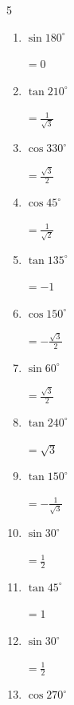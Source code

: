 \begin{multicols}{5}
\begin{enumerate}
  \item $\displaystyle \sin{180^\circ}$

        $\displaystyle =0$

  \item $\displaystyle \tan{210^\circ}$

        $\displaystyle =\frac{1}{\sqrt{3}}$

  \item $\displaystyle \cos{330^\circ}$

        $\displaystyle =\frac{\sqrt{3}}{2}$

  \item $\displaystyle \cos{45^\circ}$

        $\displaystyle =\frac{1}{\sqrt{2}}$

  \item $\displaystyle \tan{135^\circ}$

        $\displaystyle =-1$

  \item $\displaystyle \cos{150^\circ}$

        $\displaystyle =-\frac{\sqrt{3}}{2}$

  \item $\displaystyle \sin{60^\circ}$

        $\displaystyle =\frac{\sqrt{3}}{2}$

  \item $\displaystyle \tan{240^\circ}$

        $\displaystyle =\sqrt{3}$

  \item $\displaystyle \tan{150^\circ}$

        $\displaystyle =-\frac{1}{\sqrt{3}}$

  \item $\displaystyle \sin{30^\circ}$

        $\displaystyle =\frac{1}{2}$

\columnbreak %

\resetques

  \item $\displaystyle \tan{45^\circ}$

        $\displaystyle =1$

  \item $\displaystyle \sin{30^\circ}$

        $\displaystyle =\frac{1}{2}$

  \item $\displaystyle \cos{270^\circ}$


\end{enumerate}
\end{multicols}
